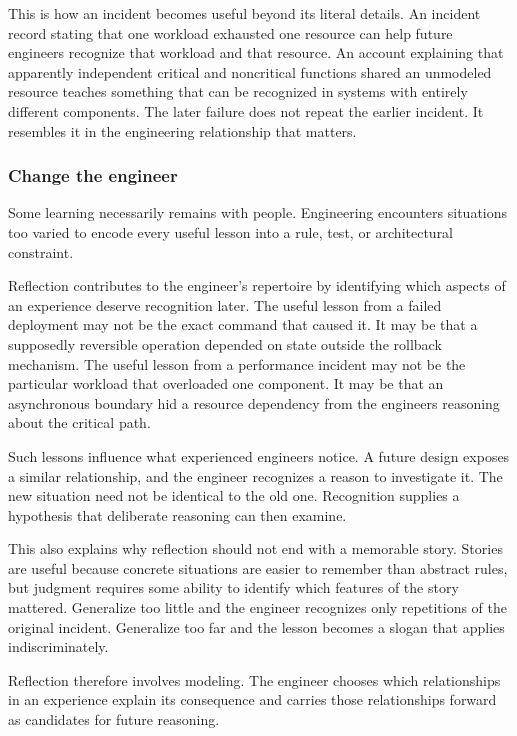 This is how an incident becomes useful beyond its literal details. An incident record stating that
one workload exhausted one resource can help future engineers recognize that workload and that
resource. An account explaining that apparently independent critical and noncritical functions
shared an unmodeled resource teaches something that can be recognized in systems with entirely
different components. The later failure does not repeat the earlier incident. It resembles it in
the engineering relationship that matters.

\subsubsection{Change the engineer}\label{sec-change-the-engineer}

Some learning necessarily remains with people. Engineering encounters situations too varied to
encode every useful lesson into a rule, test, or architectural constraint.

Reflection contributes to the engineer's repertoire by identifying which aspects of an experience
deserve recognition later. The useful lesson from a failed deployment may not be the exact command
that caused it. It may be that a supposedly reversible operation depended on state outside the
rollback mechanism. The useful lesson from a performance incident may not be the particular
workload that overloaded one component. It may be that an asynchronous boundary hid a resource
dependency from the engineers reasoning about the critical path.

Such lessons influence what experienced engineers notice. A future design exposes a similar
relationship, and the engineer recognizes a reason to investigate it. The new situation need not be
identical to the old one. Recognition supplies a hypothesis that deliberate reasoning can then
examine.

This also explains why reflection should not end with a memorable story. Stories are useful because
concrete situations are easier to remember than abstract rules, but judgment requires some ability
to identify which features of the story mattered. Generalize too little and the engineer recognizes
only repetitions of the original incident. Generalize too far and the lesson becomes a slogan that
applies indiscriminately.

Reflection therefore involves modeling. The engineer chooses which relationships in an experience
explain its consequence and carries those relationships forward as candidates for future reasoning.

